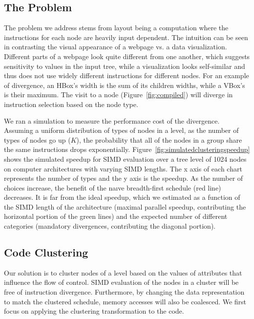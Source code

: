 




\subsection{The Problem}
The problem we address stems from layout being a computation where the instructions for each node are heavily input dependent. The intuition can be seen in contrasting the visual appearance of a webpage vs. a data visualization. Different parts of a webpage look quite different from one another, which suggests sensitivity to values in the input tree, while a visualization looks self-similar and thus does not use widely different instructions for different nodes.  For an example of divergence, an HBox's width is the sum of its children widths, while a VBox's is their maximum. The visit to a node (Figure~\ref{fig:compiled}) will diverge in instruction selection based on the node type.  

We ran a simulation to measure the performance cost of the divergence. Assuming a uniform distribution of types of nodes in a level, as the number of types of nodes go up ($K$), the probability that all of the nodes in a group share the same instructions drops exponentially. Figure~\ref{fig:simulatedclusteringspeedup} shows the simulated speedup for SIMD evaluation over a tree level of 1024 nodes on computer architectures with varying SIMD lengths. The x axis of each chart represents the number of types and the y axis is the speedup. As the number of choices increase, the benefit of the na\i{v}e breadth-first schedule (red line) decreases. It is far from the ideal speedup, which we estimated as a function of the SIMD length of the architecture (maximal parallel speedup, contributing the horizontal portion of the green lines) and the expected number of different categories (mandatory divergences, contributing the diagonal portion). 

\subsection{Code Clustering}
Our solution is to cluster nodes of a level based on the values of attributes that influence the flow of control. SIMD evaluation of the nodes in a cluster will be free of instruction divergence. Furthermore, by changing the data representation to match the clustered schedule, memory accesses will also be coalesced. We first focus on applying the clustering transformation to the code.




